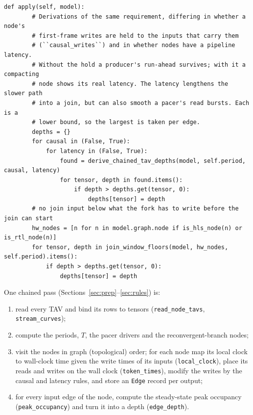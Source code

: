 \documentclass[10pt,a4paper]{article}
\newcommand{\code}[1]{\texttt{#1}}
\newcommand{\Tg}{T}           %
\begin{document}
\begin{lstlisting}[firstnumber=1181,title={\texttt{src/finn/transformation/fpgadataflow/derive\_characteristic.py}, lines 1181--1200}]
    def apply(self, model):
        # Derivations of the same requirement, differing in whether a node's
        # first-frame writes are held to the inputs that carry them
        # (``causal_writes``) and in whether nodes have a pipeline latency.
        # Without the hold a producer's run-ahead survives; with it a compacting
        # node shows its real latency. The latency lengthens the slower path
        # into a join, but can also smooth a pacer's read bursts. Each is a
        # lower bound, so the largest is taken per edge.
        depths = {}
        for causal in (False, True):
            for latency in (False, True):
                found = derive_chained_tav_depths(model, self.period, causal, latency)
                for tensor, depth in found.items():
                    if depth > depths.get(tensor, 0):
                        depths[tensor] = depth
        # no join input below what the fork has to write before the join can start
        hw_nodes = [n for n in model.graph.node if is_hls_node(n) or is_rtl_node(n)]
        for tensor, depth in join_window_floors(model, hw_nodes, self.period).items():
            if depth > depths.get(tensor, 0):
                depths[tensor] = depth
\end{lstlisting}

One chained pass (Sections~\ref{sec:prep}--\ref{sec:rules}) is:
\begin{enumerate}
\item read every TAV and bind its rows to tensors (\code{read\_node\_tavs}, \code{stream\_curves});
\item compute the periods, $\Tg$, the pacer drivers and the reconvergent-branch nodes;
\item visit the nodes in graph (topological) order; for each node map its local clock to
  wall-clock time given the write times of its inputs (\code{local\_clock}), place its reads
  and writes on the wall clock (\code{token\_times}), modify the writes by the causal and
  latency rules, and store an \code{Edge} record per output;
\item for every input edge of the node, compute the steady-state peak occupancy
  (\code{peak\_occupancy}) and turn it into a depth (\code{edge\_depth}).
\end{enumerate}

\end{document}
